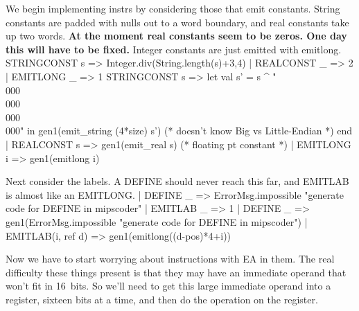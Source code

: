 \endcode
{}
We begin implementing \code{}instrs\edoc{} by considering those that emit constants.
String constants are padded with nulls out to a word boundary, and 
real constants take up two words.
{\bf At the moment real constants seem to be zeros.
One day this will have to be fixed.}
Integer constants are just emitted with \code{}emitlong\edoc{}.
\enddocs
{}
\endmoddef
  STRINGCONST s => Integer.div(String.length(s)+3,4)
| REALCONST _ => 2
| EMITLONG _ => 1
\endcode
{}
\endmoddef
  STRINGCONST s => 
        let val s' = s ^ "\\000\\000\\000\\000"
        in  gen1(emit_string (4*size) s')
                                      (* doesn't know Big vs Little-Endian *)
        end
| REALCONST s => gen1(emit_real s)  (* floating pt constant *)
| EMITLONG i => gen1(emitlong i)
\endcode
{}

Next consider the labels.
A \code{}DEFINE\edoc{} should never reach this far, and \code{}EMITLAB\edoc{} is almost like
an \code{}EMITLONG\edoc{}.
\enddocs
{}
\endmoddef
| DEFINE _ => ErrorMsg.impossible "generate code for DEFINE in mipscoder"
| EMITLAB _ => 1
\endcode
{}
\endmoddef
| DEFINE _ => gen1(ErrorMsg.impossible "generate code for DEFINE in mipscoder")
| EMITLAB(i, ref d) => gen1(emitlong((d-pos)*4+i))
\endcode
{}

Now we have to start worrying about instructions with \code{}EA\edoc{} in them.
The real difficulty these things present is that they may have an
immediate operand that won't fit in 16~bits.
So we'll need to get this large immediate operand into a register,
sixteen bits at a time, and then do the operation on the register.

